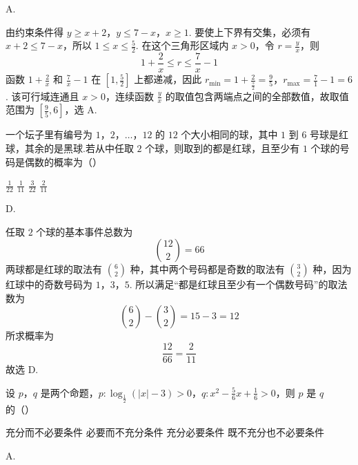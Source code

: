 \begin{answer}
A.
\end{answer}

\begin{solution}
由约束条件得
\(y\geqslant x+2\)，\(y\leqslant 7-x\)，\(x\geqslant1\).
要使上下界有交集，必须有 \(x+2\leqslant7-x\)，所以 \(1\leqslant x\leqslant\frac{5}{2}\). 在这个三角形区域内 \(x>0\)，令 \(r=\frac{y}{x}\)，则
\[
1+\frac{2}{x}\leqslant r\leqslant\frac{7}{x}-1
\]
函数 \(1+\frac{2}{x}\) 和 \(\frac{7}{x}-1\) 在 \(\left[1,\frac{5}{2}\right]\) 上都递减，因此
\(r_{\min}=1+\frac{2}{\frac{5}{2}}=\frac{9}{5}\)，\(r_{\max}=\frac{7}{1}-1=6\).
该可行域连通且 \(x>0\)，连续函数 \(\frac{y}{x}\) 的取值包含两端点之间的全部数值，故取值范围为 \(\left[\frac{9}{5},6\right]\)，选 A.
\end{solution}


\begin{problem}
一个坛子里有编号为 \(1\)，\(2\)，\(\ldots\)，\(12\) 的 \(12\) 个大小相同的球，其中 \(1\) 到 \(6\) 号球是红球，其余的是黑球.若从中任取 \(2\) 个球，则取到的都是红球，且至少有 \(1\) 个球的号码是偶数的概率为（\quad）

\choices
    {\(\frac{1}{22}\)}
    {\(\frac{1}{11}\)}
    {\(\frac{3}{22}\)}
    {\(\frac{2}{11}\)}
\end{problem}

\begin{answer}
D.
\end{answer}

\begin{solution}
任取 \(2\) 个球的基本事件总数为
\[
\binom{12}{2}=66
\]
两球都是红球的取法有 \(\binom{6}{2}\) 种，其中两个号码都是奇数的取法有 \(\binom{3}{2}\) 种，因为红球中的奇数号码为 \(1\)，\(3\)，\(5\). 所以满足“都是红球且至少有一个偶数号码”的取法数为
\[
\binom{6}{2}-\binom{3}{2}=15-3=12
\]
所求概率为
\[
\frac{12}{66}=\frac{2}{11}
\]
故选 D.
\end{solution}


\begin{problem}
设 \(p\)，\(q\) 是两个命题，\(p: \log_{\frac{1}{2}}(|x| - 3) > 0\)，\(q: x^2 - \frac{5}{6}x + \frac{1}{6} > 0\)，则 \(p\) 是 \(q\) 的（\quad）

\choices
    {充分而不必要条件}
    {必要而不充分条件}
    {充分必要条件}
    {既不充分也不必要条件}
\end{problem}

\begin{answer}
A.
\end{answer}

